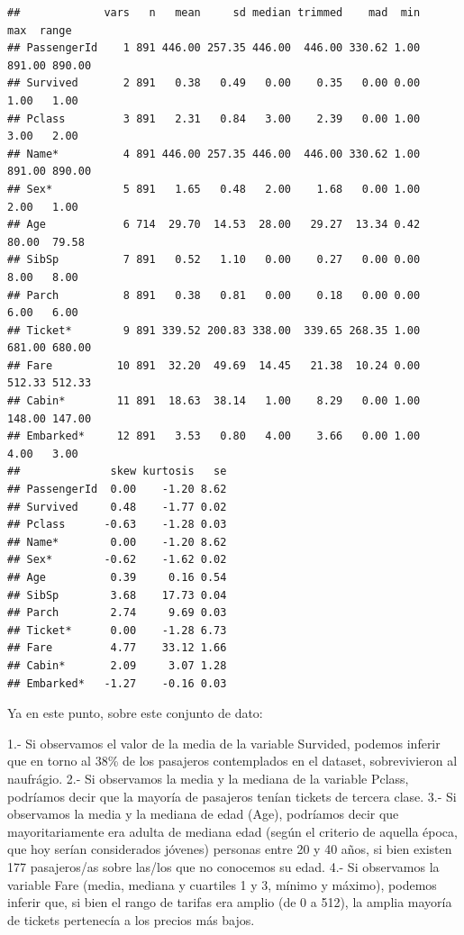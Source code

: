 \documentclass[
]{article}
\begin{document}
\begin{verbatim}
##             vars   n   mean     sd median trimmed    mad  min    max  range
## PassengerId    1 891 446.00 257.35 446.00  446.00 330.62 1.00 891.00 890.00
## Survived       2 891   0.38   0.49   0.00    0.35   0.00 0.00   1.00   1.00
## Pclass         3 891   2.31   0.84   3.00    2.39   0.00 1.00   3.00   2.00
## Name*          4 891 446.00 257.35 446.00  446.00 330.62 1.00 891.00 890.00
## Sex*           5 891   1.65   0.48   2.00    1.68   0.00 1.00   2.00   1.00
## Age            6 714  29.70  14.53  28.00   29.27  13.34 0.42  80.00  79.58
## SibSp          7 891   0.52   1.10   0.00    0.27   0.00 0.00   8.00   8.00
## Parch          8 891   0.38   0.81   0.00    0.18   0.00 0.00   6.00   6.00
## Ticket*        9 891 339.52 200.83 338.00  339.65 268.35 1.00 681.00 680.00
## Fare          10 891  32.20  49.69  14.45   21.38  10.24 0.00 512.33 512.33
## Cabin*        11 891  18.63  38.14   1.00    8.29   0.00 1.00 148.00 147.00
## Embarked*     12 891   3.53   0.80   4.00    3.66   0.00 1.00   4.00   3.00
##              skew kurtosis   se
## PassengerId  0.00    -1.20 8.62
## Survived     0.48    -1.77 0.02
## Pclass      -0.63    -1.28 0.03
## Name*        0.00    -1.20 8.62
## Sex*        -0.62    -1.62 0.02
## Age          0.39     0.16 0.54
## SibSp        3.68    17.73 0.04
## Parch        2.74     9.69 0.03
## Ticket*      0.00    -1.28 6.73
## Fare         4.77    33.12 1.66
## Cabin*       2.09     3.07 1.28
## Embarked*   -1.27    -0.16 0.03
\end{verbatim}

Ya en este punto, sobre este conjunto de dato:

1.- Si observamos el valor de la media de la variable Survided, podemos
inferir que en torno al 38\% de los pasajeros contemplados en el
dataset, sobrevivieron al naufrágio. 2.- Si observamos la media y la
mediana de la variable Pclass, podríamos decir que la mayoría de
pasajeros tenían tickets de tercera clase. 3.- Si observamos la media y
la mediana de edad (Age), podríamos decir que mayoritariamente era
adulta de mediana edad (según el criterio de aquella época, que hoy
serían considerados jóvenes) personas entre 20 y 40 años, si bien
existen 177 pasajeros/as sobre las/los que no conocemos su edad. 4.- Si
observamos la variable Fare (media, mediana y cuartiles 1 y 3, mínimo y
máximo), podemos inferir que, si bien el rango de tarifas era amplio (de
0 a 512), la amplia mayoría de tickets pertenecía a los precios más
bajos.
\end{document}
